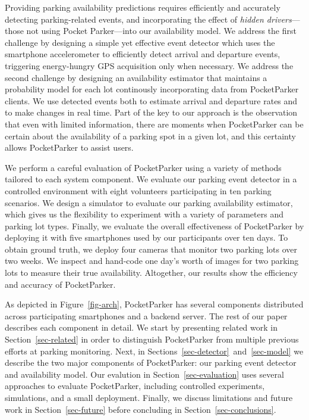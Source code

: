Providing parking availability predictions requires efficiently and
accurately detecting parking-related events, and incorporating the effect of
\textit{hidden drivers}---those not using Pocket Parker---into our
availability model. We address the first challenge by designing a simple yet
effective event detector which uses the smartphone accelerometer to
efficiently detect arrival and departure events, triggering energy-hungry GPS
acquisition only when necessary. We address the second challenge by designing
an availability estimator that maintains a probability model for each lot
continously incorporating data from PocketParker clients. We use detected
events both to estimate arrival and departure rates and to make changes in
real time. Part of the key to our approach is the observation that even with
limited information, there are moments when PocketParker can be certain about
the availability of a parking spot in a given lot, and this certainty allows
PocketParker to assist users.

We perform a careful evaluation of PocketParker using a variety of methods
tailored to each system component. We evaluate our parking event detector in
a controlled environment with eight volunteers participating in ten parking
scenarios. We design a simulator to evaluate our parking availability
estimator, which gives us the flexibility to experiment with a variety of
parameters and parking lot types. Finally, we evaluate the overall
effectiveness of PocketParker by deploying it with five smartphones used by
our participants over ten days. To obtain ground truth, we deploy four
cameras that monitor two parking lots over two weeks. We inspect and
hand-code one day's worth of images for two parking lots to measure their
true availability. Altogether, our results show the efficiency and accuracy
of PocketParker.

As depicted in Figure~\ref{fig-arch}, PocketParker has several components
distributed across participating smartphones and a backend server. The rest
of our paper describes each component in detail. We start by presenting
related work in Section~\ref{sec-related} in order to distinguish
PocketParker from multiple previous efforts at parking monitoring. Next, in
Sections~\ref{sec-detector}~and~\ref{sec-model} we describe the two major
components of PocketParker: our parking event detector and availability
model. Our evalution in Section~\ref{sec-evaluation} uses several approaches
to evaluate PocketParker, including controlled experiments, simulations, and
a small deployment. Finally, we discuss limitations and future work in
Section~\ref{sec-future} before concluding in Section~\ref{sec-conclusions}.

